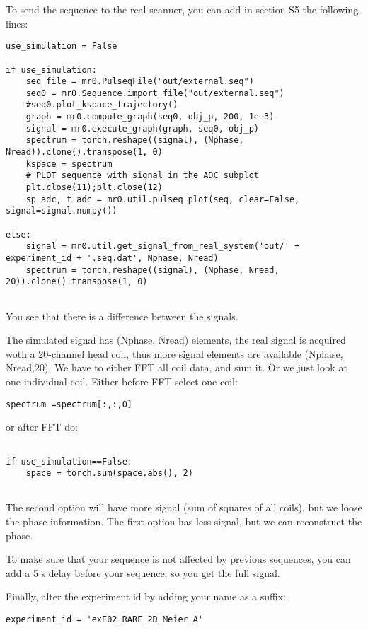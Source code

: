 \documentclass[a4paper,12pt]{extarticle}
\begin{document}
To send the sequence to the real scanner, you can add in section S5 the following lines:
\begin{verbatim}
use_simulation = False

if use_simulation:
    seq_file = mr0.PulseqFile("out/external.seq")
    seq0 = mr0.Sequence.import_file("out/external.seq")
    #seq0.plot_kspace_trajectory()
    graph = mr0.compute_graph(seq0, obj_p, 200, 1e-3)
    signal = mr0.execute_graph(graph, seq0, obj_p)
    spectrum = torch.reshape((signal), (Nphase, Nread)).clone().transpose(1, 0)
    kspace = spectrum
    # PLOT sequence with signal in the ADC subplot
    plt.close(11);plt.close(12)
    sp_adc, t_adc = mr0.util.pulseq_plot(seq, clear=False, signal=signal.numpy())

else:
    signal = mr0.util.get_signal_from_real_system('out/' + experiment_id + '.seq.dat', Nphase, Nread)
    spectrum = torch.reshape((signal), (Nphase, Nread, 20)).clone().transpose(1, 0)
    
\end{verbatim}

You see that there is a difference between the signals.

The simulated signal has (Nphase, Nread) elements, the real signal is acquired woth a 20-channel head coil, thus more signal elements are available (Nphase, Nread,20). 
We have to either FFT all coil data, and sum it. Or we just look at one individual coil.
Either before FFT select one coil:
\begin{verbatim}
spectrum =spectrum[:,:,0]
\end{verbatim}
or after FFT do:
\begin{verbatim}

if use_simulation==False:
    space = torch.sum(space.abs(), 2)
    
\end{verbatim}
The second option will have more signal (sum of squares of all coils), but we loose the phase information.
The first option has less signal, but we can reconstruct the phase.

To make sure that your sequence is not affected by previous sequences, you can add a 5 s delay before your sequence, so you get the full signal.

Finally, alter the experiment id  by adding your name as a suffix:
\begin{verbatim}
experiment_id = 'exE02_RARE_2D_Meier_A'
\end{verbatim}
\end{document}
